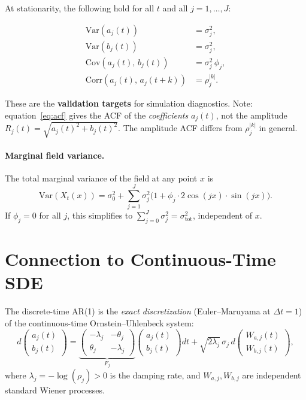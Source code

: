 \documentclass[12pt]{article}
\begin{document}
At stationarity, the following hold for all $t$ and all $j = 1,\ldots,J$:

\begin{align}
  \mathrm{Var}(a_j(t)) &= \sigma_j^2, \label{eq:var-aj} \\
  \mathrm{Var}(b_j(t)) &= \sigma_j^2, \label{eq:var-bj} \\
  \mathrm{Cov}(a_j(t),\, b_j(t)) &= \sigma_j^2\,\phi_j, \label{eq:cov-ab} \\
  \mathrm{Corr}(a_j(t),\, a_j(t+k)) &= \rho_j^{|k|}. \label{eq:acf}
\end{align}

These are the \textbf{validation targets} for simulation diagnostics. Note: equation~\eqref{eq:acf}
gives the ACF of the \emph{coefficients} $a_j(t)$, not the amplitude
$R_j(t) = \sqrt{a_j(t)^2 + b_j(t)^2}$. The amplitude ACF differs from $\rho_j^{|k|}$ in general.

\paragraph{Marginal field variance.}
The total marginal variance of the field at any point $x$ is
\[
  \mathrm{Var}(X_t(x)) = \sigma_0^2 + \sum_{j=1}^J \sigma_j^2\bigl(1 + \phi_j \cdot 2\cos(jx)\cdot\sin(jx)\bigr).
\]
If $\phi_j = 0$ for all $j$, this simplifies to $\sum_{j=0}^J \sigma_j^2 = \sigma^2_\mathrm{tot}$,
independent of $x$.

\section{Connection to Continuous-Time SDE}

The discrete-time AR(1) is the \emph{exact discretization} (Euler--Maruyama at $\Delta t = 1$)
of the continuous-time Ornstein--Uhlenbeck system:
\begin{equation}
  d\begin{pmatrix} a_j(t) \\ b_j(t) \end{pmatrix}
  = \underbrace{\begin{pmatrix} -\lambda_j & -\theta_j \\ \theta_j & -\lambda_j \end{pmatrix}}_{F_j}
    \begin{pmatrix} a_j(t) \\ b_j(t) \end{pmatrix} dt
  + \sqrt{2\lambda_j}\,\sigma_j\, d\begin{pmatrix} W_{a,j}(t) \\ W_{b,j}(t) \end{pmatrix},
  \label{eq:sde}
\end{equation}
where $\lambda_j = -\log(\rho_j) > 0$ is the damping rate, and $W_{a,j}, W_{b,j}$ are
independent standard Wiener processes.
\end{document}
